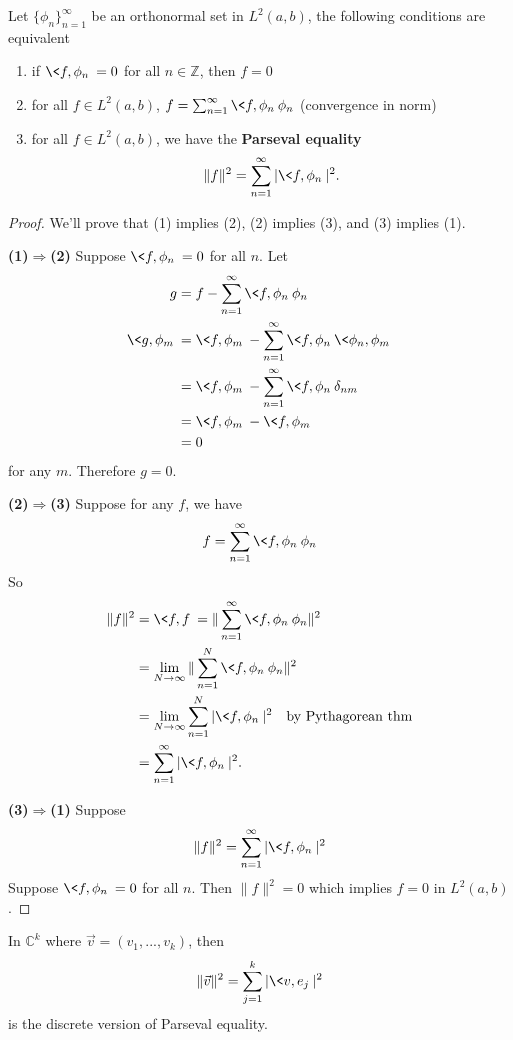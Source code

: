 \begin{thm}
Let $\{\phi_n\}^{\infty}_{n=1}$ be an orthonormal set in
$L^{2}(a,b)$, the following conditions are equivalent
\begin{enumerate}
\item if $\<f,\phi_n\>=0$ for all $n\in\mathbb{Z}$, then
  $f=0$
\item for all $f\in L^{2}(a,b)$,
  $f=\sum^{\infty}_{n=1}\<f,\phi_n\>\phi_n$ (convergence in
  norm)
\item for all $f\in L^{2}(a,b)$, we have the
  \textbf{Parseval equality}
\begin{equation}
\|f\|^2=\sum^{\infty}_{n=1}|\<f,\phi_n\>|^2.
\end{equation}
\end{enumerate}
\end{thm}
\begin{proof}
We'll prove that (1) implies (2), (2) implies (3), and (3)
implies (1).

\textbf{(1)$\Rightarrow$(2)} Suppose $\<f,\phi_n\>=0$ for
all $n$. Let
\begin{align*}
g &= f-\sum^{\infty}_{n=1}\<f,\phi_n\>\phi_n\\
\<g,\phi_m\> &=
\<f,\phi_m\>-\sum^{\infty}_{n=1}\<f,\phi_n\>\<\phi_n,\phi_m\>\\
&=\<f,\phi_m\>-\sum^{\infty}_{n=1}\<f,\phi_n\>\delta_{nm}\\
&=\<f,\phi_m\> - \<f,\phi_m\>\\
&=0
\end{align*}
for any $m$. Therefore $g=0$.

\textbf{(2)$\Rightarrow$(3)} Suppose for any $f$, we have
\begin{equation}
f = \sum^{\infty}_{n=1}\<f,\phi_n\>\phi_n
\end{equation}
So
\begin{align*}
\|f\|^2 &= \<f,f\> =
\|\sum^{\infty}_{n=1}\<f,\phi_n\>\phi_n\|^2\\
&=\lim_{N\to\infty}\|\sum^{N}_{n=1}\<f,\phi_n\>\phi_n\|^2\\
&=\lim_{N\to\infty}\sum^{N}_{n=1}|\<f,\phi_n\>|^2\quad\text{by Pythagorean thm}\\
&=\sum^{\infty}_{n=1}|\<f,\phi_n\>|^2.
\end{align*}

\textbf{(3)$\Rightarrow$(1)} Suppose 
\begin{equation}
\|f\|^2 = \sum^{\infty}_{n=1}|\<f,\phi_n\>|^2
\end{equation}
Suppose $\<f,\phi_n\>=0$ for all $n$. Then $\|f\|^2=0$ which
implies $f=0$ in $L^{2}(a,b)$.
\end{proof}

\begin{rmk}
In $\mathbb{C}^k$ where $\vec{v}=(v_1,...,v_k)$, then
\begin{equation}
\|\vec{v}\|^2 = \sum^{k}_{j=1}|\<v,e_j\>|^2
\end{equation}
is the discrete version of Parseval equality.
\end{rmk}
